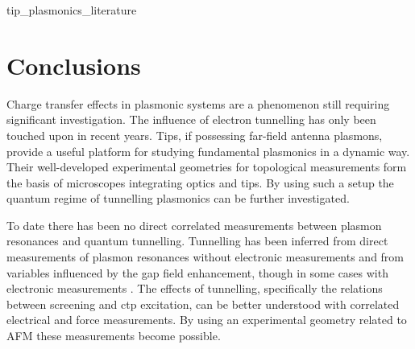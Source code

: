 \documentclass[12pt, a4paper, oneside]{book}
\begin{document}
{tip_plasmonics_literature}

\section{Conclusions}

Charge transfer effects in plasmonic systems are a phenomenon still requiring significant investigation. The influence of electron tunnelling has only been touched upon in recent years. Tips, if possessing far-field antenna plasmons, provide a useful platform for studying fundamental plasmonics in a dynamic way. Their well-developed experimental geometries for topological measurements form the basis of microscopes integrating optics and tips. By using such a setup the quantum regime of tunnelling plasmonics can be further investigated.

To date there has been no direct correlated measurements between plasmon resonances and quantum tunnelling. Tunnelling has been inferred from direct measurements of plasmon resonances without electronic measurements \cite{savage2012, scholl2013} and from variables influenced by the gap field enhancement, though in some cases with electronic measurements \cite{tan2014, zhu2014, hajisalem2014, cha2014}. The effects of tunnelling, specifically the relations between screening and \gls{ctp} excitation, can be better understood with correlated electrical and force measurements. By using an experimental geometry related to AFM these measurements become possible.

\ifstandalone
\begin{singlespace}
\fontsize{8pt}{1em}\selectfont
\printbibliography[notcategory=fullcited]
\end{singlespace}
\fi
\end{document}
